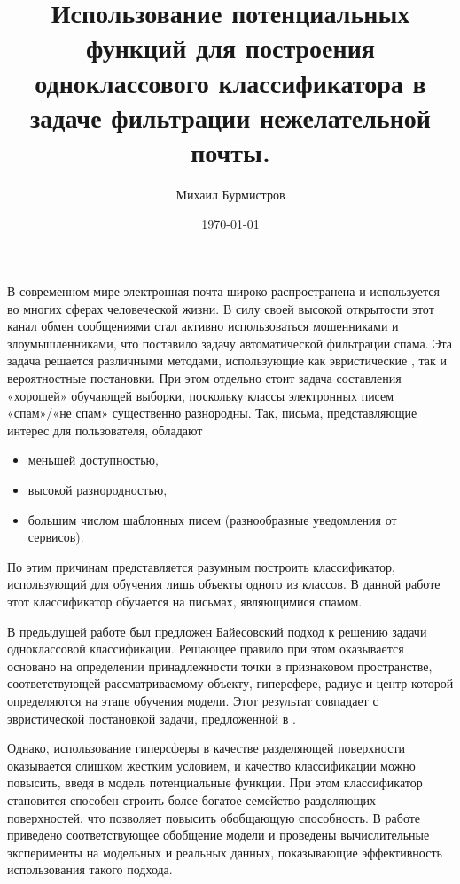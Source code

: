 \documentclass[12pt,a4paper,oneside]{article}
\begin{document}
	\title{Использование потенциальных функций для построения одноклассового классификатора в задаче фильтрации нежелательной почты.}
	\author{Михаил Бурмистров}
	\date{\today}

В современном мире электронная почта широко распространена и используется во многих сферах человеческой жизни. 
В силу своей высокой открытости этот канал обмен сообщениями стал активно использоваться мошенниками и злоумышленниками, что поставило задачу автоматической фильтрации спама. 
Эта задача решается различными методами, использующие как эвристические \cite{Islam2007, Sun2008}, так и вероятностные постановки. 
При этом отдельно стоит задача составления «хорошей» обучающей выборки, поскольку классы электронных писем  «спам»/«не спам» существенно разнородны. Так, письма, представляющие интерес для пользователя, обладают
\begin{itemize}
		\item меньшей доступностью,
		\item высокой разнородностью,
		\item большим числом шаблонных писем (разнообразные уведомления от сервисов).
\end{itemize}
По этим причинам представляется разумным построить классификатор, использующий для обучения лишь объекты одного из классов. 
В данной работе этот классификатор обучается на письмах, являющимися спамом.

В предыдущей работе \cite{JMLDA2012no4} был предложен Байесовский подход к решению задачи одноклассовой классификации. 
Решающее правило при этом оказывается основано на определении принадлежности точки в признаковом пространстве, соответствующей рассматриваемому объекту, гиперсфере, радиус и центр которой определяются на этапе обучения модели. 
Этот результат совпадает с эвристической постановкой задачи, предложенной в \cite{Tax2001}. 

Однако, использование гиперсферы  в качестве разделяющей поверхности оказывается слишком жестким условием, и качество классификации можно повысить, введя в модель потенциальные функции.
При этом классификатор становится способен строить более богатое семейство разделяющих поверхностей, что позволяет повысить обобщающую способность. 
В работе приведено соответствующее обобщение модели и проведены вычислительные эксперименты на модельных и реальных данных, показывающие эффективность использования такого подхода. 
\end{document}
